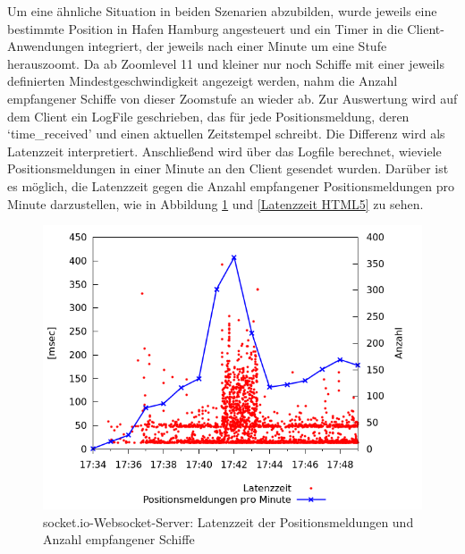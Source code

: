    Um eine ähnliche Situation in beiden Szenarien abzubilden, wurde jeweils eine bestimmte Position in Hafen Hamburg angesteuert und ein Timer in die Client-Anwendungen integriert, der jeweils nach einer Minute um eine Stufe herauszoomt. Da ab Zoomlevel 11 und kleiner nur noch Schiffe mit einer jeweils definierten Mindestgeschwindigkeit angezeigt werden, nahm die Anzahl empfangener Schiffe von dieser Zoomstufe an wieder ab. Zur Auswertung wird auf dem Client ein LogFile geschrieben, das für jede Positionsmeldung, deren ‘time\_received’ und einen aktuellen Zeitstempel schreibt.  Die Differenz wird als Latenzzeit interpretiert. Anschließend wird über das Logfile berechnet, wieviele Positionsmeldungen in einer Minute an den Client gesendet wurden. Darüber ist es möglich, die Latenzzeit gegen die Anzahl empfangener Positionsmeldungen pro Minute darzustellen, wie in Abbildung \ref{Latenzzeit socket.io} und \ref{Latenzzeit HTML5} zu sehen.
\begin {figure}[H]
\begin{center}
  \includegraphics[width=4.5in]{images/latency_timeReceived_socket_io.png}
\end{center}
\caption{socket.io-Websocket-Server: Latenzzeit der Positionsmeldungen und Anzahl empfangener Schiffe}
\label {Latenzzeit socket.io}
\end {figure}

